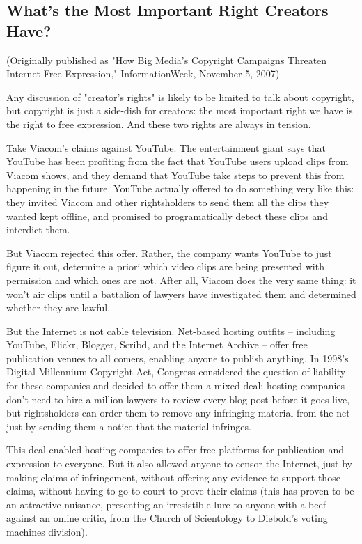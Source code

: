 \subsection{What's the Most Important Right Creators Have?}

(Originally published as "How Big Media's Copyright Campaigns
Threaten Internet Free Expression," InformationWeek, November 5,
2007)

Any discussion of "creator's rights" is likely to be limited to
talk about copyright, but copyright is just a side-dish for
creators: the most important right we have is the right to free
expression. And these two rights are always in tension.

Take Viacom's claims against YouTube. The entertainment giant says
that YouTube has been profiting from the fact that YouTube users
upload clips from Viacom shows, and they demand that YouTube take
steps to prevent this from happening in the future. YouTube
actually offered to do something very like this: they invited
Viacom and other rightsholders to send them all the clips they
wanted kept offline, and promised to programatically detect these
clips and interdict them.

But Viacom rejected this offer. Rather, the company wants YouTube
to just figure it out, determine a priori which video clips are
being presented with permission and which ones are not. After all,
Viacom does the very same thing: it won't air clips until a
battalion of lawyers have investigated them and determined whether
they are lawful.

But the Internet is not cable television. Net-based hosting outfits
-- including YouTube, Flickr, Blogger, Scribd, and the Internet
Archive -- offer free publication venues to all comers, enabling
anyone to publish anything. In 1998's Digital Millennium Copyright
Act, Congress considered the question of liability for these
companies and decided to offer them a mixed deal: hosting companies
don't need to hire a million lawyers to review every blog-post
before it goes live, but rightsholders can order them to remove any
infringing material from the net just by sending them a notice that
the material infringes.

This deal enabled hosting companies to offer free platforms for
publication and expression to everyone. But it also allowed anyone
to censor the Internet, just by making claims of infringement,
without offering any evidence to support those claims, without
having to go to court to prove their claims (this has proven to be
an attractive nuisance, presenting an irresistible lure to anyone
with a beef against an online critic, from the Church of
Scientology to Diebold's voting machines division).

